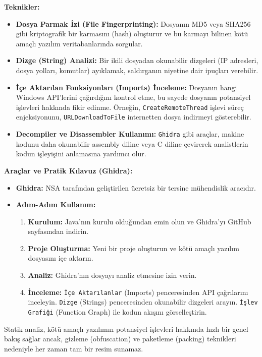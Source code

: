 \textbf{Teknikler:}
\begin{itemize}
    \item \textbf{Dosya Parmak İzi (File Fingerprinting):} Dosyanın MD5 veya SHA256 gibi kriptografik bir karmasını (hash) oluşturur ve bu karmayı bilinen kötü amaçlı yazılım veritabanlarında sorgular.
    \item \textbf{Dizge (String) Analizi:} Bir ikili dosyadan okunabilir dizgeleri (IP adresleri, dosya yolları, komutlar) ayıklamak, saldırganın niyetine dair ipuçları verebilir.
    \item \textbf{İçe Aktarılan Fonksiyonları (Imports) İnceleme:} Dosyanın hangi Windows API'lerini çağırdığını kontrol etme, bu sayede dosyanın potansiyel işlevleri hakkında fikir edinme. Örneğin, \texttt{CreateRemoteThread} işlevi süreç enjeksiyonunu, \texttt{URLDownloadToFile} internetten dosya indirmeyi gösterebilir.
    \item \textbf{Decompiler ve Disassembler Kullanımı:} \texttt{Ghidra} gibi araçlar, makine kodunu daha okunabilir assembly diline veya C diline çevirerek analistlerin kodun işleyişini anlamasına yardımcı olur.
\end{itemize}

\textbf{Araçlar ve Pratik Kılavuz (Ghidra):}
\begin{itemize}
    \item \textbf{Ghidra:} NSA tarafından geliştirilen ücretsiz bir tersine mühendislik aracıdır.
    \item \textbf{Adım-Adım Kullanım:}
    \begin{enumerate}
        \item \textbf{Kurulum:} Java'nın kurulu olduğundan emin olun ve Ghidra'yı GitHub sayfasından indirin.
        \item \textbf{Proje Oluşturma:} Yeni bir proje oluşturun ve kötü amaçlı yazılım dosyasını içe aktarın.
        \item \textbf{Analiz:} Ghidra'nın dosyayı analiz etmesine izin verin.
        \item \textbf{İnceleme:} \texttt{İçe Aktarılanlar} (Imports) penceresinden API çağrılarını inceleyin. \texttt{Dizge} (Strings) penceresinden okunabilir dizgeleri arayın. \texttt{İşlev Grafiği} (Function Graph) ile kodun akışını görselleştirin.
    \end{enumerate}
\end{itemize}

Statik analiz, kötü amaçlı yazılımın potansiyel işlevleri hakkında hızlı bir genel bakış sağlar ancak, gizleme (obfuscation) ve paketleme (packing) teknikleri nedeniyle her zaman tam bir resim sunamaz.


